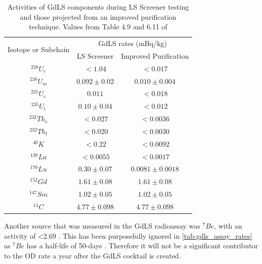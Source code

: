 \begin{table}[!htbp]
    \centering
    \begin{tabular}{c|c|c}
        \multirow{2}{*}{Isotope or Subchain}  &  \multicolumn{2}{c}{GdLS rates (mBq/kg)}      \\ 
                             &  LS Screener          & Improved Purification \\ \hline
        ${}^{238}U_{e}$      &  $< 1.04$             & $< 0.017$             \\ 
        ${}^{238}U_{m}$      &  $0.092\pm0.02$       & $0.010\pm0.004$       \\
        ${}^{235}U_{e}$      &  $0.011$              & $< 0.018$             \\
        ${}^{235}U_{l}$      &  $0.10\pm0.04$        & $< 0.012$             \\
        ${}^{232}Th_{e}$     &  $< 0.027$            & $< 0.0036$            \\
        ${}^{232}Th_{l}$     &  $< 0.020$            & $< 0.0030$            \\
        ${}^{40}K$           &  $< 0.22$             & $< 0.0092$            \\
        ${}^{138}La$         &  $< 0.0055$           & $< 0.0017$            \\
        ${}^{176}Lu$         &  $0.30\pm0.07$        & $0.0081\pm0.0018$     \\
        ${}^{152}{Gd}$       &  $1.61\pm0.08$        & $1.61\pm0.08$         \\
        ${}^{147}{Sm}$       &  $1.02\pm0.05$        & $1.02\pm0.05$         \\
        ${}^{14}{C}$         &  $4.77\pm0.098$       & $4.77\pm0.098$ 
    \end{tabular}
    \caption{Activities of GdLS components during LS Screener testing and those projected from an improved purification technique. Values from Table 4.9 and 6.11 of \cite{scotthaselschwardt_thesis_ref}}
    \label{tab:gdls_assay_rates}
\end{table}
\par
Another source that was measured in the GdLS radioassay was ${}^{7}Be$, with an activity of <2.69 \cite{scotthaselschwardt_thesis_ref}.
This has been purposefully ignored in \autoref{tab:gdls_assay_rates} as ${}^{7}Be$ has a half-life of 50-days \cite{be7_decay_ref}.
Therefore it will not be a significant contributor to the OD rate a year after the GdLS cocktail is created.


